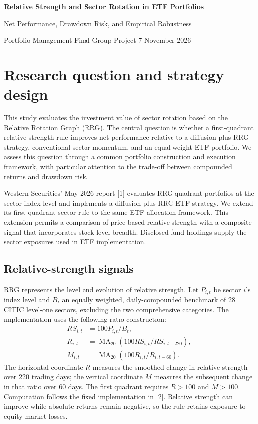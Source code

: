 

{\LARGE\bfseries Relative Strength and Sector Rotation in ETF Portfolios}\par
{\large Net Performance, Drawdown Risk, and Empirical Robustness}\par
{\small Portfolio Management Final Group Project \hfill 7 November 2026}

\section{Research question and strategy design}
This study evaluates the investment value of sector rotation based on the Relative Rotation Graph (RRG). The central question is whether a first-quadrant relative-strength rule improves net performance relative to a diffusion-plus-RRG strategy, conventional sector momentum, and an equal-weight ETF portfolio. We assess this question through a common portfolio construction and execution framework, with particular attention to the trade-off between compounded returns and drawdown risk.

Western Securities' May 2026 report [1] evaluates RRG quadrant portfolios at the sector-index level and implements a diffusion-plus-RRG ETF strategy. We extend its first-quadrant sector rule to the same ETF allocation framework. This extension permits a comparison of price-based relative strength with a composite signal that incorporates stock-level breadth. Disclosed fund holdings supply the sector exposures used in ETF implementation.

\subsection{Relative-strength signals}
RRG represents the level and evolution of relative strength. Let $P_{i,t}$ be sector $i$'s index level and $B_t$ an equally weighted, daily-compounded benchmark of 28 CITIC level-one sectors, excluding the two comprehensive categories. The implementation uses the following ratio construction:
\begin{align*}
RS_{i,t}&=100P_{i,t}/B_t,\\[-3pt]
R_{i,t}&=\operatorname{MA}_{20}\!\left(100RS_{i,t}/RS_{i,t-220}\right),\\[-3pt]
M_{i,t}&=\operatorname{MA}_{20}\!\left(100R_{i,t}/R_{i,t-60}\right).
\end{align*}
The horizontal coordinate $R$ measures the smoothed change in relative strength over 220 trading days; the vertical coordinate $M$ measures the subsequent change in that ratio over 60 days. The first quadrant requires $R>100$ and $M>100$. Computation follows the fixed implementation in [2]. Relative strength can improve while absolute returns remain negative, so the rule retains exposure to equity-market losses.

